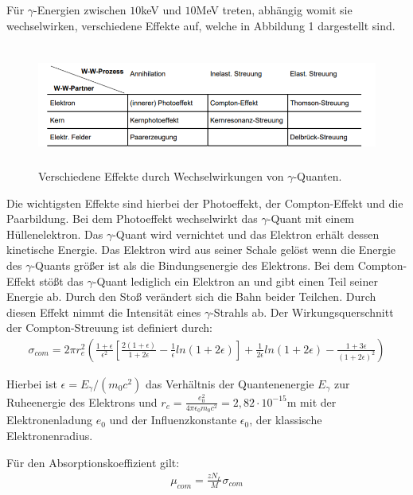 Für $\gamma$-Energien zwischen $10$keV und $10$MeV treten, abhängig womit sie wechselwirken, verschiedene Effekte auf,
welche in Abbildung 1 dargestellt sind.

\begin{figure}[H]
  \centering
  \includegraphics[height=4cm]{wechselwirkung.PNG}
  \caption{Verschiedene Effekte durch Wechselwirkungen von $\gamma$-Quanten. \cite{sample}}
  \label{fig:Linienspektrum}
\end{figure}

Die wichtigsten Effekte sind hierbei der Photoeffekt, der Compton-Effekt und die Paarbildung. Bei dem Photoeffekt wechselwirkt das
$\gamma$-Quant mit einem Hüllenelektron. Das $\gamma$-Quant wird vernichtet und das Elektron erhält dessen kinetische Energie.
Das Elektron wird aus seiner Schale gelöst wenn die Energie des $\gamma$-Quants größer ist als die Bindungsenergie des Elektrons.
Bei dem Compton-Effekt stößt das $\gamma$-Quant lediglich ein Elektron an und gibt einen Teil seiner Energie ab. Durch den Stoß
verändert sich die Bahn beider Teilchen. Durch diesen Effekt nimmt die Intensität eines $\gamma$-Strahls ab. Der
Wirkungsquerschnitt der Compton-Streuung ist definiert durch:
\begin{align}
  \sigma_{com} = 2 \pi r_e^2 \left(\frac{1+\epsilon}{\epsilon^2} \left[\frac{2(1+\epsilon)}{1+2\epsilon}-\frac{1}{\epsilon} ln(1+2\epsilon) \right]
                + \frac{1}{2\epsilon} ln(1+2\epsilon) - \frac{1+3\epsilon}{(1+2\epsilon)^2} \right)
\end{align}

Hierbei ist $\epsilon = E_{\gamma}/(m_0 c^2)$ das Verhältnis der Quantenenergie $E_{\gamma}$ zur Ruheenergie des Elektrons und
$r_e = \frac{e_0^2}{4 \pi \epsilon_0 m_0 c^2} = 2,82 \cdot 10^{-15}$m mit der Elektronenladung $e_0$ und der
Influenzkonstante $\epsilon_0$, der klassische Elektronenradius.

Für den Absorptionskoeffizient gilt:
\begin{align}
  \mu_{com} =\frac{z N_L}{M} \sigma_{com}
\end{align}

